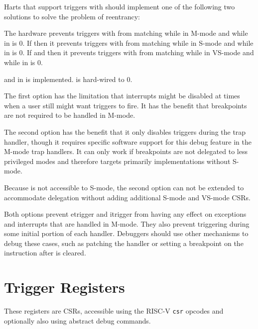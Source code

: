 \begin{steps}{Harts that support triggers with 
should implement one of the following two solutions to solve the problem of
reentrancy:}
\item The hardware prevents triggers with  from
matching while in M-mode and while \FcsrMstatusMie in \Rmstatus is 0.  If
 then it prevents triggers with 
from matching while in S-mode and while \FcsrSstatusSie in \Rsstatus is 0.
If  and  then it prevents triggers with
 from matching while in VS-mode and while
\FcsrSstatusSie in \Rvsstatus is 0.
\item \FcsrTcontrolMte and \FcsrTcontrolMpte in \RcsrTcontrol is
implemented.  \Rmedeleg[3] is hard-wired to 0.
\end{steps}

\begin{commentary}
The first option has the limitation that interrupts might be disabled at
times when a user still might want triggers to fire.  It has the benefit
that breakpoints are not required to be handled in M-mode.

The second option has the benefit that it only disables triggers during
the trap handler, though it requires specific software support for this debug
feature in the M-mode trap handlers.  It can only work if breakpoints are not
delegated to less privileged modes and therefore targets primarily
implementations without S-mode.

Because \RcsrTcontrol is not accessible to S-mode, the second option can
not be extended to accommodate delegation without adding additional S-mode
and VS-mode CSRs.

Both options prevent etrigger and itrigger from having any effect on
exceptions and interrupts that are handled in M-mode.  They also prevent
triggering during some initial portion of each handler.  Debuggers should
use other mechanisms to debug these cases, such as patching the handler
or setting a breakpoint on the instruction after \FcsrMstatusMie is cleared.
\end{commentary}

\section{Trigger Registers}

These registers are CSRs, accessible using the RISC-V {\tt csr} opcodes and
optionally also using abstract debug commands.

